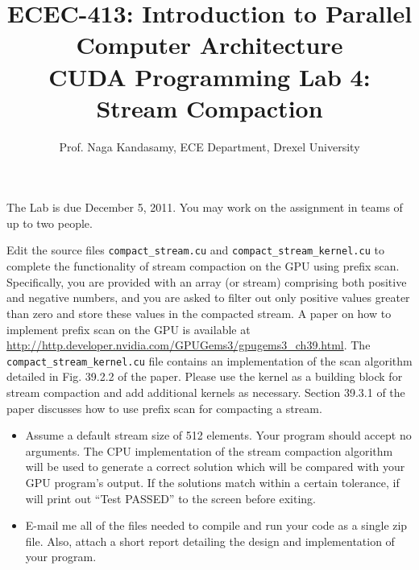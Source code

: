 \documentclass[11.5pt]{article}
\begin{document}
\newcommand{\captionfonts}{\bf}{\small}
\makeatletter  %
\long\def\@makecaption#1#2{%
  \vskip\abovecaptionskip
  \sbox\@tempboxa{{\captionfonts #1: #2}}%
  \ifdim \wd\@tempboxa >\hsize
    {\captionfonts #1: #2\par}
  \else
    \hbox to\hsize{\hfil\box\@tempboxa\hfil}%
  \fi
  \vskip\belowcaptionskip}
\makeatother   %
\renewcommand{\figurename}{Fig.} %

\title{ECEC-413: Introduction to Parallel Computer Architecture \\ CUDA Programming Lab 4: Stream Compaction}
\author{Prof. Naga Kandasamy, ECE Department, Drexel University}
\maketitle %
\date{}

\noindent The Lab is due December 5, 2011. You may work on the assignment in teams of up to two people.
\vspace{12pt}

\noindent Edit the source files \texttt{compact\_stream.cu} and \texttt{compact\_stream\_kernel.cu} to complete the functionality of stream compaction on the GPU using prefix scan. Specifically, you are provided with an array (or stream) comprising both positive and negative numbers, and you are asked to filter out only positive values greater than zero and store these values in the compacted stream. A paper on how to implement prefix scan on the GPU is available at \url{http://http.developer.nvidia.com/GPUGems3/gpugems3_ch39.html}. The \texttt{compact\_stream\_kernel.cu} file contains an implementation of the scan algorithm detailed in Fig. 39.2.2 of the paper. Please use the kernel as a building block for stream compaction and add additional kernels as necessary. Section 39.3.1 of the paper discusses how to use prefix scan for compacting a stream.

\begin{itemize}
\item Assume a default stream size of 512 elements. Your program should accept no arguments. The
CPU implementation of the stream compaction algorithm will be used to generate a correct solution
which will be compared with your GPU program's output. If the solutions match within a certain
tolerance, if will print out ``Test PASSED'' to the screen before exiting.


\item E-mail me all of the files needed to compile and run your code as a single zip file. Also, attach a short
report detailing the design and implementation of your program.
\end{itemize}

\end{document}
